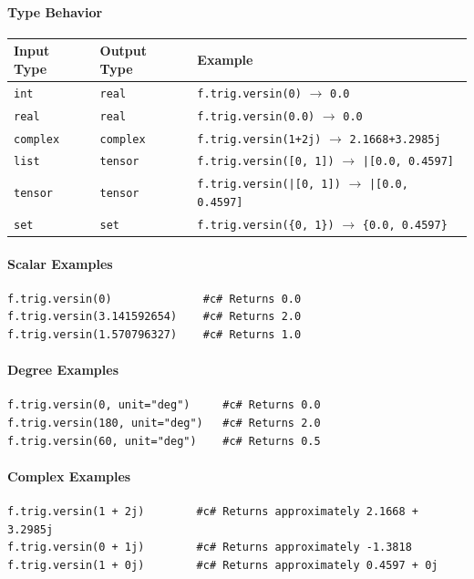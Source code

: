 \paragraph{Type Behavior}
\begin{center}
\begin{tabular}{lll}
\textbf{Input Type} & \textbf{Output Type} & \textbf{Example} \\ \hline
\texttt{int} & \texttt{real} & \texttt{f.trig.versin(0)} $\to$ \texttt{0.0} \\
\texttt{real} & \texttt{real} & \texttt{f.trig.versin(0.0)} $\to$ \texttt{0.0} \\
\texttt{complex} & \texttt{complex} & \texttt{f.trig.versin(1+2j)} $\to$ \texttt{2.1668+3.2985j} \\
\texttt{list} & \texttt{tensor} & \texttt{f.trig.versin([0, 1])} $\to$ \texttt{|[0.0, 0.4597]} \\
\texttt{tensor} & \texttt{tensor} & \texttt{f.trig.versin(|[0, 1])} $\to$ \texttt{|[0.0, 0.4597]} \\
\texttt{set} & \texttt{set} & \texttt{f.trig.versin(\{0, 1\})} $\to$ \texttt{\{0.0, 0.4597\}} \\
\end{tabular}
\end{center}

\paragraph{Scalar Examples}
\begin{verbatim}
f.trig.versin(0)              #c# Returns 0.0
f.trig.versin(3.141592654)    #c# Returns 2.0
f.trig.versin(1.570796327)    #c# Returns 1.0
\end{verbatim}

\paragraph{Degree Examples}
\begin{verbatim}
f.trig.versin(0, unit="deg")     #c# Returns 0.0
f.trig.versin(180, unit="deg")   #c# Returns 2.0
f.trig.versin(60, unit="deg")    #c# Returns 0.5
\end{verbatim}

\paragraph{Complex Examples}
\begin{verbatim}
f.trig.versin(1 + 2j)        #c# Returns approximately 2.1668 + 3.2985j
f.trig.versin(0 + 1j)        #c# Returns approximately -1.3818
f.trig.versin(1 + 0j)        #c# Returns approximately 0.4597 + 0j
\end{verbatim}

